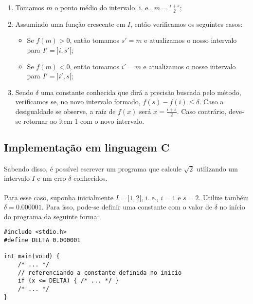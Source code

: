 \documentclass{article}
\begin{document}
            \begin{enumerate}
                \item Tomamos $m$ o ponto médio do intervalo, i. e., $m = \frac{i + s} {2}$;
                \item Assumindo uma função crescente em $I$, então verificamos os seguintes casos:
                \begin{itemize}
                    \item Se $f(m) > 0$, então tomamos $s' = m$ e atualizamos o nosso intervalo para
                    $I' = ]i, s'[$;

                    \item Se $f(m) < 0$, então tomamos $i' = m$ e atualizamos o nosso intervalo para
                    $I' = ]i', s[$;
                \end{itemize}
                \item Sendo $\delta$ uma constante conhecida que dirá a precisão buscada pelo método,
                verificamos se, no novo intervalo formado, $f(s) - f(i) \leq \delta$. Caso a desigualdade se
                observe, a raíz de $f(x)$ será $x = \frac{i + s} {2}$. Caso contrário, deve-se retornar ao item 1 com
                o novo intervalo.
            \end{enumerate}

        \subsection{Implementação em linguagem C}
            \paragraph{}
            Sabendo disso, é possível escrever um programa que calcule $\sqrt{2}$ utilizando um intervalo $I$ e um
            erro $\delta$ conhecidos.

            \paragraph{}
            Para esse caso, suponha inicialmente $I = ]1, 2[$, i. e., $i = 1$ e $s = 2$. Utilize também $\delta = 0.000001$.
            Para isso, pode-se definir uma constante com o valor de $\delta$ no início do programa da seguinte forma:
            \begin{lstlisting}
#include <stdio.h>
#define DELTA 0.000001

int main(void) {
    /* ... */
    // referenciando a constante definida no inicio
    if (x <= DELTA) { /* ... */ }
    /* ... */
}
            \end{lstlisting}
\end{document}
